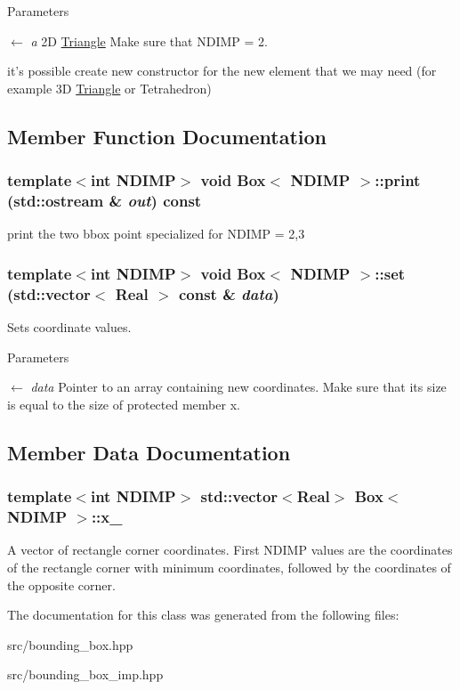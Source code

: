 \begin{DoxyParams}{Parameters}
\item[\mbox{$\leftarrow$} {\em a}]2D \hyperlink{classTriangle}{Triangle} Make sure that NDIMP = 2.\end{DoxyParams}
it's possible create new constructor for the new element that we may need (for example 3D \hyperlink{classTriangle}{Triangle} or Tetrahedron) 

\subsection{Member Function Documentation}
\hypertarget{classBox_a625059fd5ee270a5392632825601154e}{
\subsubsection[{print}]{\setlength{\rightskip}{0pt plus 5cm}template$<$int NDIMP$>$ void {\bf Box}$<$ NDIMP $>$::print (std::ostream \& {\em out}) const}}
\label{classBox_a625059fd5ee270a5392632825601154e}
print the two bbox point specialized for NDIMP = 2,3 \hypertarget{classBox_ab4053092717a3fabb8bdc88f28e20a9f}{
\subsubsection[{set}]{\setlength{\rightskip}{0pt plus 5cm}template$<$int NDIMP$>$ void {\bf Box}$<$ NDIMP $>$::set (std::vector$<$ Real $>$ const \& {\em data})}}
\label{classBox_ab4053092717a3fabb8bdc88f28e20a9f}
Sets coordinate values.


\begin{DoxyParams}{Parameters}
\item[\mbox{$\leftarrow$} {\em data}]Pointer to an array containing new coordinates. Make sure that its size is equal to the size of protected member x. \end{DoxyParams}


\subsection{Member Data Documentation}
\hypertarget{classBox_a07648c6766718416a0a68dcd46258933}{
\subsubsection[{x\_\-}]{\setlength{\rightskip}{0pt plus 5cm}template$<$int NDIMP$>$ std::vector$<$Real$>$ {\bf Box}$<$ NDIMP $>$::{\bf x\_\-}}}
\label{classBox_a07648c6766718416a0a68dcd46258933}
A vector of rectangle corner coordinates. First NDIMP values are the coordinates of the rectangle corner with minimum coordinates, followed by the coordinates of the opposite corner. 

The documentation for this class was generated from the following files:\begin{DoxyCompactItemize}
\item 
src/bounding\_\-box.hpp\item 
src/bounding\_\-box\_\-imp.hpp\end{DoxyCompactItemize}
